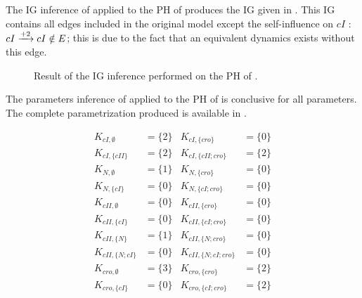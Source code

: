 \begin{example}
  The IG inference of  applied to the PH of 
  produces the IG given in .
  This IG contains all edges included in the original model except the
  self-influence on $cI$ : $cI \xrightarrow{+ 2} cI \notin E$;
  this is due to the fact that an equivalent dynamics exists without this edge.
  \begin{figure}[t]
  \centering
  \caption{\label{fig:phage-lambda-ig}%
    Result of the IG inference performed on the PH of .
  }
  \end{figure}
\end{example}

\begin{example}
  The parameters inference of  applied to the PH of 
  is conclusive for all parameters.
  The complete parametrization produced is available in .
  \begin{table}[t]
  \begin{align*}
    K_{cI, \emptyset} &= \{2\} &
    K_{cI, \{cro\}} &= \{0\} \\
    K_{cI, \{cII\}} &= \{2\} &
    K_{cI, \{cII;cro\}} &= \{2\} \\
    K_{N, \emptyset} &= \{1\} &
    K_{N, \{cro\}} &= \{0\} \\
    K_{N, \{cI\}} &= \{0\} &
    K_{N, \{cI;cro\}} &= \{0\} \\
    K_{cII, \emptyset} &= \{0\} &
    K_{cII, \{cro\}} &= \{0\} \\
    K_{cII, \{cI\}} &= \{0\} &
    K_{cII, \{cI;cro\}} &= \{0\} \\
    K_{cII, \{N\}} &= \{1\} &
    K_{cII, \{N;cro\}} &= \{0\} \\
    K_{cII, \{N;cI\}} &= \{0\} &
    K_{cII, \{N;cI;cro\}} &= \{0\} \\
    K_{cro, \emptyset} &= \{3\} &
    K_{cro, \{cro\}} &= \{2\} \\
    K_{cro, \{cI\}} &= \{0\} &
    K_{cro, \{cI;cro\}} &= \{2\}
  \end{align*}
  \caption{\label{tb:phage-lambda-k}%
    Result of the parameters inference performed on the PH of .
  }
  \end{table}
\end{example}
